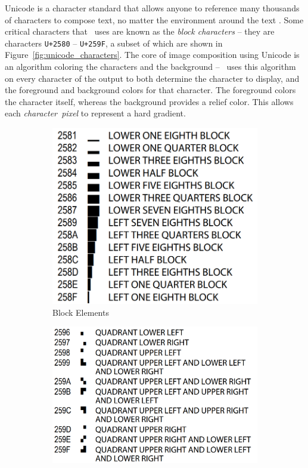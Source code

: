 Unicode is a character standard that allows anyone to reference many thousands of characters to compose text, no matter the environment around the text \cite{unicode}.
Some critical characters that \name\ uses are known as the {\it block characters} -- they are characters \texttt{U+2580} -- \texttt{U+259F}, a subset of which are shown in Figure~\ref{fig:unicode_characters}.
The core of image composition using Unicode is an algorithm coloring the characters and the background -- \name\ uses this algorithm on every character of the output to both determine the character to display, and the foreground and background colors for that character.
The foreground colors the character itself, whereas the background provides a relief color.
This allows each {\it character~pixel} to represent a hard gradient.

\begin{figure}[htb]
  \centering
  \hspace{0.3em}
  \begin{subfigure}[htb]{0.4\textwidth}
    \includegraphics[width=\textwidth]{resources/block_elements}
    \caption{Block Elements}
    \label{fig:unicode_block_characters}
  \end{subfigure}
  \hfill
  \begin{subfigure}[htb]{0.51\textwidth}
    \includegraphics[width=\textwidth]{resources/quadrant_elements}

\end{subfigure}
\end{figure}
